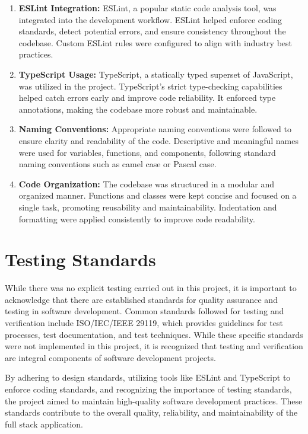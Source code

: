 \begin{enumerate}
	\item \textbf{ESLint Integration: } ESLint, a popular static code analysis tool, was integrated into the development workflow. ESLint helped enforce coding standards, detect potential errors, and ensure consistency throughout the codebase. Custom ESLint rules were configured to align with industry best practices.
	\item \textbf{TypeScript Usage: } TypeScript, a statically typed superset of JavaScript, was utilized in the project. TypeScript's strict type-checking capabilities helped catch errors early and improve code reliability. It enforced type annotations, making the codebase more robust and maintainable.
	\item \textbf{Naming Conventions: } Appropriate naming conventions were followed to ensure clarity and readability of the code. Descriptive and meaningful names were used for variables, functions, and components, following standard naming conventions such as camel case or Pascal case.
	\item \textbf{Code Organization: } The codebase was structured in a modular and organized manner. Functions and classes were kept concise and focused on a single task, promoting reusability and maintainability. Indentation and formatting were applied consistently to improve code readability.
\end{enumerate}

\section{Testing Standards}
While there was no explicit testing carried out in this project, it is important to acknowledge that there are established standards for quality assurance and testing in software development. Common standards followed for testing and verification include ISO/IEC/IEEE 29119, which provides guidelines for test processes, test documentation, and test techniques. While these specific standards were not implemented in this project, it is recognized that testing and verification are integral components of software development projects.

By adhering to design standards, utilizing tools like ESLint and TypeScript to enforce coding standards, and recognizing the importance of testing standards, the project aimed to maintain high-quality software development practices. These standards contribute to the overall quality, reliability, and maintainability of the full stack application.